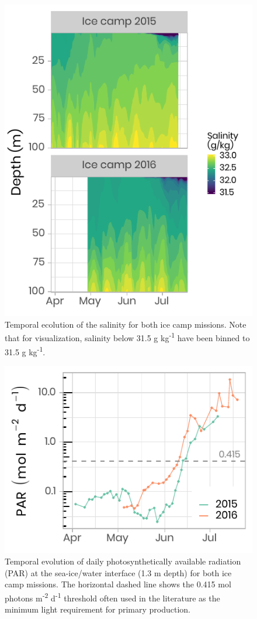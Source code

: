 \documentclass[12pt,a4paper]{scrartcl}
\begin{document}
\begin{figure}[h]
	\centering
	\includegraphics[scale = 2]{../../../graphs/fig3.pdf}
	\caption{Temporal ecolution of the salinity for both ice camp missions. Note that for visualization, salinity below 31.5 g kg\textsuperscript{-1} have been binned to 31.5 g kg\textsuperscript{-1}.}
\end{figure}

\begin{figure}[h]
	\centering
	\includegraphics[scale = 2]{../../../graphs/fig4.pdf}
	\caption{Temporal evolution of daily photosynthetically available radiation (PAR) at the sea-ice/water interface (1.3 m depth) for both ice camp missions. The horizontal dashed line shows the 0.415 mol photons m\textsuperscript{-2} d\textsuperscript{-1} threshold often used in the literature as the minimum light requirement for primary production.}
\end{figure}
\end{document}
